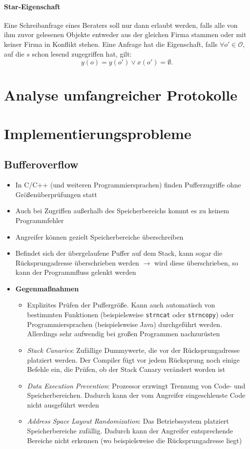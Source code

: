\paragraph{Star-Eigenschaft}
Eine Schreibanfrage eines Beraters soll nur dann erlaubt werden, falls alle von ihm zuvor gelesenen Objekte entweder aus der gleichen Firma stammen oder mit keiner Firma in Konflikt stehen. Eine Anfrage hat die Eigenschaft, falls \(\forall o' \in \mathcal{O}\), auf die \(s\) schon lesend zugegriffen hat, gilt:
\[y(o) = y(o') \vee x(o') = \emptyset.\]



\section{Analyse umfangreicher Protokolle}



\section{Implementierungsprobleme}

\subsection{Bufferoverflow}
\begin{itemize}
	\item In C/C++ (und weiteren Programmiersprachen) finden Pufferzugriffe ohne Größenüberprüfungen statt
	\item Auch bei Zugriffen außerhalb des Speicherbereichs kommt es zu keinem Programmfehler
	\item Angreifer können gezielt Speicherbereiche überschreiben
	\item Befindet sich der übergelaufene Puffer auf dem Stack, kann sogar die Rücksprungadresse überschrieben werden \(\rightarrow\) wird diese überschrieben, so kann der Programmfluss gelenkt werden
	\item \textbf{Gegenmaßnahmen}
	\begin{itemize}
		\item Explizites Prüfen der Puffergröße. Kann auch automatisch von bestimmten Funktionen (beispielsweise \texttt{strncat} oder \texttt{strncopy}) oder Programmiersprachen (beispielsweise Java) durchgeführt werden. Allerdings sehr aufwendig bei großen Programmen nachzurüsten
		\item \textit{Stack Canaries}: Zufällige Dummywerte, die vor der Rücksprungadresse platziert werden. Der Compiler fügt vor jedem Rücksprung noch einige Befehle ein, die Prüfen, ob der Stack Canary verändert worden ist
		\item \textit{Data Execution Prevention}: Prozessor erzwingt Trennung von Code- und Speicherbereichen. Dadurch kann der vom Angreifer eingeschleuste Code nicht ausgeführt werden
		\item \textit{Address Space Layout Randomization}: Das Betriebssystem platziert Speicherbereiche zufällig. Dadurch kann der Angreifer entsprechende Bereiche nicht erkennen (wo beispielsweise die Rücksprungadresse liegt)
	\end{itemize}
\end{itemize}


